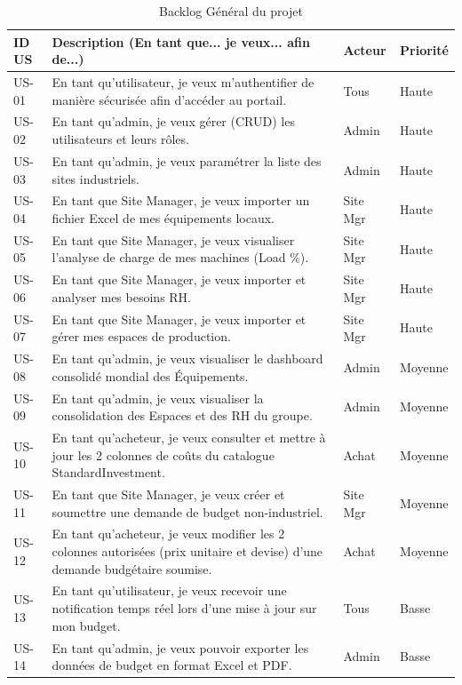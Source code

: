 \begin{table}[h]
\centering
\begin{tabular}{|p{2cm}|p{8cm}|p{2cm}|p{2cm}|}
\hline
\textbf{ID US} & \textbf{Description (En tant que... je veux... afin de...)} & \textbf{Acteur} & \textbf{Priorité} \\ \hline
US-01 & En tant qu'utilisateur, je veux m'authentifier de manière sécurisée afin d'accéder au portail. & Tous & Haute \\ \hline
US-02 & En tant qu'admin, je veux gérer (CRUD) les utilisateurs et leurs rôles. & Admin & Haute \\ \hline
US-03 & En tant qu'admin, je veux paramétrer la liste des sites industriels. & Admin & Haute \\ \hline
US-04 & En tant que Site Manager, je veux importer un fichier Excel de mes équipements locaux. & Site Mgr & Haute \\ \hline
US-05 & En tant que Site Manager, je veux visualiser l'analyse de charge de mes machines (Load \%). & Site Mgr & Haute \\ \hline
US-06 & En tant que Site Manager, je veux importer et analyser mes besoins RH. & Site Mgr & Haute \\ \hline
US-07 & En tant que Site Manager, je veux importer et gérer mes espaces de production. & Site Mgr & Haute \\ \hline
US-08 & En tant qu'admin, je veux visualiser le dashboard consolidé mondial des Équipements. & Admin & Moyenne \\ \hline
US-09 & En tant qu'admin, je veux visualiser la consolidation des Espaces et des RH du groupe. & Admin & Moyenne \\ \hline
US-10 & En tant qu'acheteur, je veux consulter et mettre à jour les 2 colonnes de coûts du catalogue StandardInvestment. & Achat & Moyenne \\ \hline
US-11 & En tant que Site Manager, je veux créer et soumettre une demande de budget non-industriel. & Site Mgr & Moyenne \\ \hline
US-12 & En tant qu'acheteur, je veux modifier les 2 colonnes autorisées (prix unitaire et devise) d'une demande budgétaire soumise. & Achat & Moyenne \\ \hline
US-13 & En tant qu'utilisateur, je veux recevoir une notification temps réel lors d'une mise à jour sur mon budget. & Tous & Basse \\ \hline
US-14 & En tant qu'admin, je veux pouvoir exporter les données de budget en format Excel et PDF. & Admin & Basse \\ \hline
\end{tabular}
\caption{Backlog Général du projet}
\label{tab:backlog}
\end{table}

